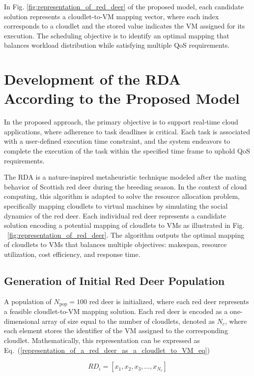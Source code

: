 \documentclass[pdflatex,sn-mathphys-num]{sn-jnl}%
\begin{document}
In Fig. \ref{fig:representation_of_red_deer} of the proposed model, each candidate solution represents a cloudlet-to-VM mapping vector, where each index corresponds to a cloudlet and the stored value indicates the VM assigned for its execution. The scheduling objective is to identify an optimal mapping that balances workload distribution while satisfying multiple QoS requirements.

\FloatBarrier
\section{Development of the RDA According to the Proposed Model}\label{sec4}
In the proposed approach, the primary objective is to support real-time cloud applications, where adherence to task deadlines is critical. Each task is associated with a user-defined execution time constraint, and the system endeavors to complete the execution of the task within the specified time frame to uphold QoS requirements.

The RDA is a nature-inspired metaheuristic technique modeled after the mating behavior of Scottish red deer during the breeding season. In the context of cloud computing, this algorithm is adapted to solve the resource allocation problem, specifically mapping cloudlets to virtual machines by simulating the social dynamics of the red deer. Each individual red deer represents a candidate solution encoding a potential mapping of cloudlets to VMs as illustrated in Fig. ~\ref{fig:representation_of_red_deer}. The algorithm outputs the optimal mapping of cloudlets to VMs that balances multiple objectives: makespan, resource utilization, cost efficiency, and response time.

\subsection{Generation of Initial Red Deer Population}\label{subsec4.1}

A population of $N_{\text{pop}} = 100$ red deer is initialized, where each red deer represents a feasible cloudlet-to-VM mapping solution. Each red deer is encoded as a one-dimensional array of size equal to the number of cloudlets, denoted as $N_c$, where each element stores the identifier of the VM assigned to the corresponding cloudlet. Mathematically, this representation can be expressed as Eq.~(\ref{representation_of_a_red_deer_as_a_cloudlet_to_VM_eq})

\begin{equation}\label{representation_of_a_red_deer_as_a_cloudlet_to_VM_eq}
RD_i = [x_1, x_2, x_3, \dots, x_{N_c}]
\end{equation}
\end{document}
